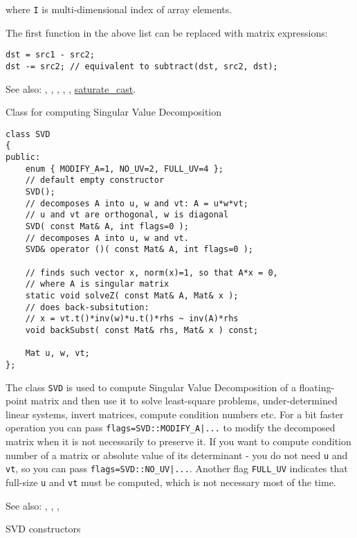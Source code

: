 where \texttt{I} is multi-dimensional index of array elements.

The first function in the above list can be replaced with matrix expressions:
\begin{lstlisting}
dst = src1 - src2;
dst -= src2; // equivalent to subtract(dst, src2, dst);
\end{lstlisting}

See also: , , , ,
, \hyperref[cppfunc.saturatecast]{saturate\_cast}.

Class for computing Singular Value Decomposition

\begin{lstlisting}
class SVD
{
public:
    enum { MODIFY_A=1, NO_UV=2, FULL_UV=4 };
    // default empty constructor
    SVD();
    // decomposes A into u, w and vt: A = u*w*vt;
    // u and vt are orthogonal, w is diagonal
    SVD( const Mat& A, int flags=0 );
    // decomposes A into u, w and vt.
    SVD& operator ()( const Mat& A, int flags=0 );

    // finds such vector x, norm(x)=1, so that A*x = 0,
    // where A is singular matrix
    static void solveZ( const Mat& A, Mat& x );
    // does back-subsitution:
    // x = vt.t()*inv(w)*u.t()*rhs ~ inv(A)*rhs
    void backSubst( const Mat& rhs, Mat& x ) const;

    Mat u, w, vt;
};
\end{lstlisting}

The class \texttt{SVD} is used to compute Singular Value Decomposition of a floating-point matrix and then use it to solve least-square problems, under-determined linear systems, invert matrices, compute condition numbers etc.
For a bit faster operation you can pass \texttt{flags=SVD::MODIFY\_A|...} to modify the decomposed matrix when it is not necessarily to preserve it. If you want to compute condition number of a matrix or absolute value of its determinant - you do not need \texttt{u} and \texttt{vt}, so you can pass \texttt{flags=SVD::NO\_UV|...}. Another flag \texttt{FULL\_UV} indicates that full-size \texttt{u} and \texttt{vt} must be computed, which is not necessary most of the time.

See also: , , , 

SVD constructors

